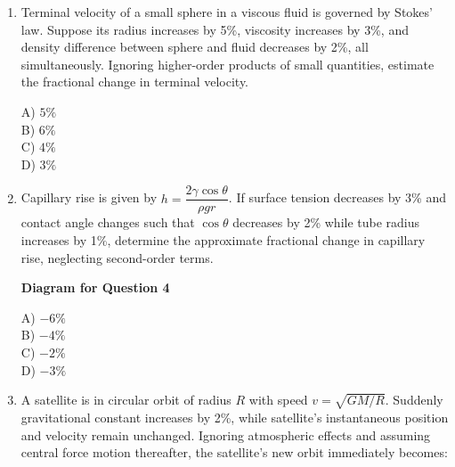 \documentclass[12pt]{article}
\begin{document}
\begin{enumerate}
\begin{center}
\end{center}

A) $1\%$ \\
B) $2\%$ \\
C) $3\%$ \\
D) $4\%$

\item Terminal velocity of a small sphere in a viscous fluid is governed by Stokes’ law. Suppose its radius increases by 5\%, viscosity increases by 3\%, and density difference between sphere and fluid decreases by 2\%, all simultaneously. Ignoring higher-order products of small quantities, estimate the fractional change in terminal velocity.

A) $5\%$ \\
B) $6\%$ \\
C) $4\%$ \\
D) $3\%$

\item Capillary rise is given by $h=\dfrac{2\gamma \cos\theta}{\rho g r}$. If surface tension decreases by 3\% and contact angle changes such that $\cos\theta$ decreases by 2\% while tube radius increases by 1\%, determine the approximate fractional change in capillary rise, neglecting second-order terms.

\begin{center}
\textbf{Diagram for Question 4}
\end{center}

A) $-6\%$ \\
B) $-4\%$ \\
C) $-2\%$ \\
D) $-3\%$

\item A satellite is in circular orbit of radius $R$ with speed $v=\sqrt{GM/R}$. Suddenly gravitational constant increases by 2\%, while satellite’s instantaneous position and velocity remain unchanged. Ignoring atmospheric effects and assuming central force motion thereafter, the satellite’s new orbit immediately becomes:


\end{enumerate}
\end{document}
